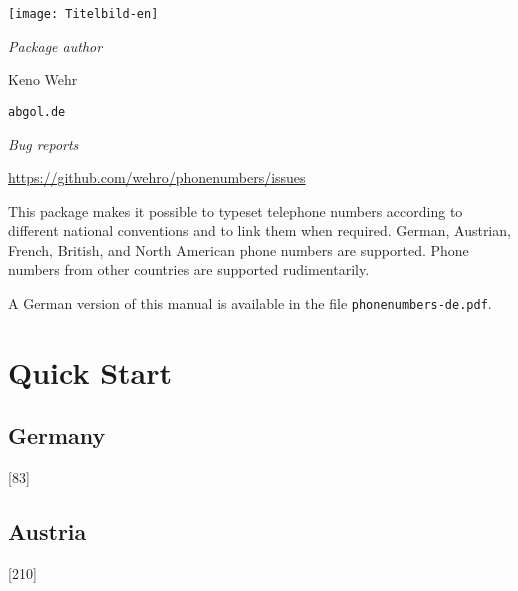 \documentclass[numbers=noenddot]{scrreprt}
\newcommand\EMailDomain{abgol}
\newcommand\EMailTopLevelDomain{de}
\begin{document}
\begin{titlepage}
\begin{center}
\texttt{[image: Titelbild-en]}

\vfill
\large
\textit{Package author}

\smallskip
Keno Wehr

\normalsize
\texttt{\EMail@\EMailDomain.\EMailTopLevelDomain}

\bigskip
\large
\textit{Bug reports}

\smallskip
\normalsize
\url{https://github.com/wehro/phonenumbers/issues}
\end{center}

\bigskip
\noindent This package makes it possible to typeset telephone numbers according to different national conventions and to link them when required. German, Austrian, French, British, and North American phone numbers are supported. Phone numbers from other countries are supported rudimentarily.

\bigskip
\noindent A German version of this manual is available in the file \texttt{phonenumbers-de.pdf}.
\end{titlepage}

\tableofcontents


\chapter{Quick Start}
\section{Germany}
\begin{sidebyside}
  [83]
\end{sidebyside}
\begin{sidebyside}
\end{sidebyside}
\begin{sidebyside}
\end{sidebyside}
\begin{sidebyside}
\end{sidebyside}

\section{Austria}
\begin{sidebyside}
  [210]
\end{sidebyside}
\end{document}
